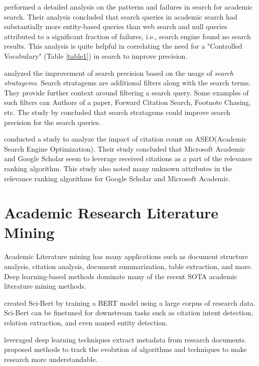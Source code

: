 \cite{li2017investigating} performed a detailed analysis on the patterns and failures in search for academic search. 
Their analysis concluded that search queries in academic search had substantially more entity-based queries than web search and 
null queries attributed to a significant fraction of failures, i.e., search engine found no search results. 
This analysis is quite helpful in correlating the need for a "Controlled Vocabulary" (Table \ref{table1}) in search to improve precision. 

\cite{kacem2018analysis} analyzed the improvement of search precision based on the usage of \textit{search stratagems}.
Search stratagems are additional filters along with the search terms. They provide further context around filtering a search query. 
Some examples of such filters can Authors of a paper, Forward Citation Search, Footnote Chasing, etc.
The study by \cite{kacem2018analysis} concluded that search stratagems could improve search precision for the search queries.

\cite{rovira2019ranking} conducted a study to analyze the impact of citation count on ASEO(Academic Search Engine Optimization). 
Their study concluded that Microsoft Academic and Google Scholar seem to leverage received citations as a part of the relevance 
ranking algorithm. This study also noted many unknown attributes in the relevance ranking algorithms for Google Scholar and Microsoft Academic.


\section{Academic Research Literature Mining}
\label{relatedwork:acad-lit-mining}
Academic Literature mining has many applications such as document structure analysis, citation analysis, document summarization, table extraction, and more. Deep learning-based methods dominate many of the recent SOTA academic literature mining methods. 

\cite{beltagy2019scibert} created Sci-Bert by training a BERT model \parencite{devlin2018bert} using a large corpus of research data. Sci-Bert can be finetuned for downstream tasks such as citation intent detection, relation extraction, and even named entity detection. 
 
\cite{safder2020deep} leveraged deep learning techniques extract metadata from research documents. \cite{zha2019mining} proposed methods to track the evolution of algorithms and techniques to make research more understandable. 

